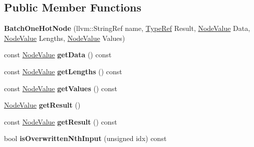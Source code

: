\subsection*{Public Member Functions}
\begin{DoxyCompactItemize}
\item 
\mbox{\label{classglow_1_1_batch_one_hot_node_abd188558470270fbcd1804ba0ab1bf32}} 
{\bfseries Batch\+One\+Hot\+Node} (llvm\+::\+String\+Ref name, \hyperlink{structglow_1_1_type}{Type\+Ref} Result, \hyperlink{structglow_1_1_node_value}{Node\+Value} Data, \hyperlink{structglow_1_1_node_value}{Node\+Value} Lengths, \hyperlink{structglow_1_1_node_value}{Node\+Value} Values)
\item 
\mbox{\label{classglow_1_1_batch_one_hot_node_af42cc408f5c57dbfdb3f3b660e0ba966}} 
const \hyperlink{structglow_1_1_node_value}{Node\+Value} {\bfseries get\+Data} () const
\item 
\mbox{\label{classglow_1_1_batch_one_hot_node_a41279c4c0526f7448857f6dc6e8f90bd}} 
const \hyperlink{structglow_1_1_node_value}{Node\+Value} {\bfseries get\+Lengths} () const
\item 
\mbox{\label{classglow_1_1_batch_one_hot_node_abc1f375ef88a4dfd1255321ec2c6f452}} 
const \hyperlink{structglow_1_1_node_value}{Node\+Value} {\bfseries get\+Values} () const
\item 
\mbox{\label{classglow_1_1_batch_one_hot_node_a54f5605c9659a09fa654730f2993f491}} 
\hyperlink{structglow_1_1_node_value}{Node\+Value} {\bfseries get\+Result} ()
\item 
\mbox{\label{classglow_1_1_batch_one_hot_node_aba1e8b39b3d453b05e74450a930e1224}} 
const \hyperlink{structglow_1_1_node_value}{Node\+Value} {\bfseries get\+Result} () const
\item 
\mbox{\label{classglow_1_1_batch_one_hot_node_a1e28bfb6d3815ede7a40ae53bea38b72}} 
bool {\bfseries is\+Overwritten\+Nth\+Input} (unsigned idx) const
\item 
\mbox{\label{classglow_1_1_batch_one_hot_node_a910b888001f17798625d57868f0a9c51}} 

\end{DoxyCompactItemize}
